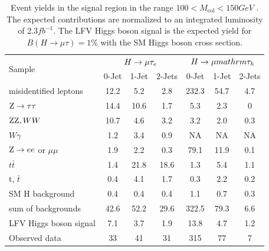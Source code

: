 \documentclass[oneside, letterpaper, oldfontcommands]{memoir}
\begin{document}
{{{ \begin{table}[hbtp]
 \centering  \caption{Event yields in the signal region in the range $100 < M_\text{col} < 150GeV$ . The expected contributions are normalized to an integrated luminosity
of 2.3$fb^{-1}$. The LFV Higgs boson signal is the expected yield for $B(H \rightarrow \mu \tau)=1\%$ with the SM Higgs boson cross section.}
  \label{tab:EventYieldTable_100_to_150}
  \begin{tabular}{lccc|ccc} \hline
        \multirow{2}{*}{Sample}                                & \multicolumn{3}{c}{$H \rightarrow \mu \mathrm{\tau}_{e}$}                &     \multicolumn{3}{c}{$H \rightarrow \mu mathrm{\tau_{h}}$}     \\ \cline{2-7}
                                              &  0-Jet            & 1-Jet            & 2-Jets               &  0-Jet             & 1-Jet            & 2-Jets  \\ \hline
    misidentified leptons                    &  12.2  &   5.2     &  2.8 & 232.3 & 54.7 & 4.7 \\
    $ \mathrm{Z} \rightarrow \mathrm{\tau} \mathrm{\tau}$                    & 14.4   & 10.6      &  1.7 & 5.3   & 2.3  & 0  \\
    $ \mathrm{Z}\mathrm{Z},WW$                       & 10.7   &  4.6      &  3.2 & 3.2   & 2.0  & 0.3\\
    $ W\gamma$                             &   1.2  &  3.4      &  0.9 &NA & NA & NA    \\
    $ \mathrm{Z} \rightarrow ee$ or $\mu \mu$          &  1.9   &  2.2      &  0.3 & 79.1 & 11.9& 0.1  \\
    $t\bar{t}     $                            &  1.4   & 21.8      & 18.6 &1.3 & 5.4 & 1.1    \\
    t, $\bar{t}$                             &  0.4   &  4.1      &  1.7 &0.3 & 2.2 & 0.2    \\
    SM H background                        &  0.4   &  0.4      &  0.4 &1.1 & 0.7 & 0.3    \\ \hline
    sum of backgrounds                       & 42.6   & 52.2      & 29.6 &322.5& 79.3 & 6.6  \\  \hline
    LFV Higgs boson signal                   &  7.1   &  3.7      &  1.9 &13.8 & 4.7 & 1.2    \\ \hline \hline
      Observed data                          &  33    &  41       &  31  & 315 & 77 & 7 \\ \hline
  \end{tabular}
\end{table}


}}}
\end{document}
